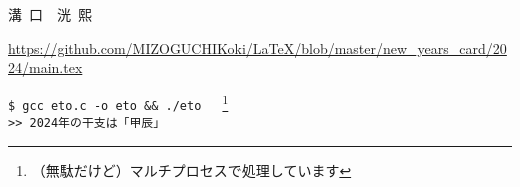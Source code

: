 \documentclass[twocolumn,fontsize=9pt]{jlreq}
\begin{document}
\begin{framed}
    
    \vspace{.5cm}
    \begin{center}
        {\LARGE 溝\ 口\ \  洸\ 熙}
    \end{center}
\end{framed}
\noindent\tiny{\url{https://github.com/MIZOGUCHIKoki/LaTeX/blob/master/new_years_card/2024/main.tex}}
\newpage

\small{\texttt{\$ gcc eto.c -o eto \&\& ./eto }\ \ \footnote{（無駄だけど）マルチプロセスで処理しています}\\
    \texttt{>> 2024年の干支は「甲辰」}}
\end{document}

